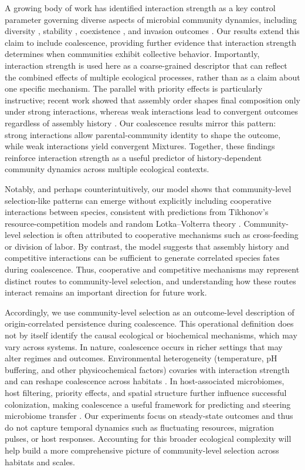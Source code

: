 A growing body of work has identified interaction strength as a key control parameter governing diverse aspects of microbial community dynamics, including diversity \citep{Hu2022, Marsland2019}, stability \citep{Allesina2012, Ratzke2020}, coexistence \citep{Grilli2017}, and invasion outcomes \citep{Hu2025, Kurkjian2021}. Our results extend this claim to include coalescence, providing further evidence that interaction strength determines when communities exhibit collective behavior. Importantly, interaction strength is used here as a coarse-grained descriptor that can reflect the combined effects of multiple ecological processes, rather than as a claim about one specific mechanism. The parallel with priority effects is particularly instructive; recent work showed that assembly order shapes final composition only under strong interactions, whereas weak interactions lead to convergent outcomes regardless of assembly history \citep{Hu2025, Fukami2015}. Our coalescence results mirror this pattern: strong interactions allow parental-community identity to shape the outcome, while weak interactions yield convergent Mixtures. Together, these findings reinforce interaction strength as a useful predictor of history-dependent community dynamics across multiple ecological contexts.

Notably, and perhaps counterintuitively, our model shows that community-level selection-like patterns can emerge without explicitly including cooperative interactions between species, consistent with predictions from Tikhonov's resource-competition models \citep{Tikhonov2016} and random Lotka--Volterra theory \citep{May1972, Grilli2017}. Community-level selection is often attributed to cooperative mechanisms such as cross-feeding or division of labor. By contrast, the model suggests that assembly history and competitive interactions can be sufficient to generate correlated species fates during coalescence. Thus, cooperative and competitive mechanisms may represent distinct routes to community-level selection, and understanding how these routes interact remains an important direction for future work.

Accordingly, we use community-level selection as an outcome-level description of origin-correlated persistence during coalescence. This operational definition does not by itself identify the causal ecological or biochemical mechanisms, which may vary across systems. In nature, coalescence occurs in richer settings that may alter regimes and outcomes. Environmental heterogeneity (temperature, pH buffering, and other physicochemical factors) covaries with interaction strength and can reshape coalescence across habitats \citep{Rillig2015, Castledine2020, Rillig2017, Tropini2017}. In host-associated microbiomes, host filtering, priority effects, and spatial structure further influence successful colonization, making coalescence a useful framework for predicting and steering microbiome transfer \citep{Liu2024, Smillie2018, Rocca2021}. Our experiments focus on steady-state outcomes and thus do not capture temporal dynamics such as fluctuating resources, migration pulses, or host responses. Accounting for this broader ecological complexity will help build a more comprehensive picture of community-level selection across habitats and scales.
